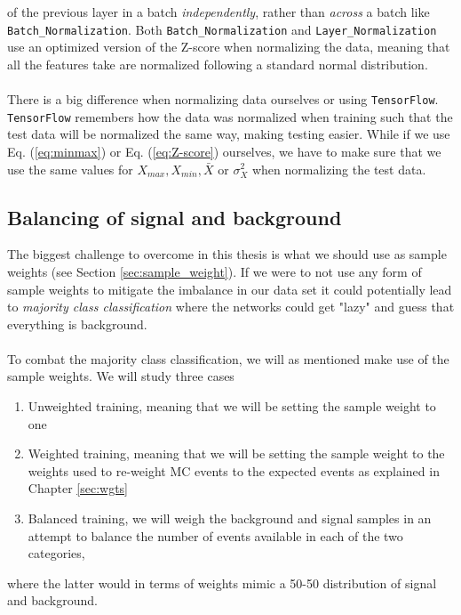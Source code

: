 \documentclass[12pt, a4paper]{book}
\begin{document}
of the previous layer in a batch \textit{independently}, rather than \textit{across} a batch like \verb|Batch_Normalization|. Both \verb|Batch_Normalization| and \verb|Layer_Normalization| use an optimized version of the Z-score when normalizing the data, meaning that all the features 
take are normalized following a standard normal distribution.\\
\\There is a big difference when normalizing data ourselves or using \verb|TensorFlow|. \verb|TensorFlow| remembers how the data was normalized when training such that the test data will be normalized the same way, making testing easier. While if we use Eq. (\ref{eq:minmax}) or 
Eq. (\ref{eq:Z-score}) ourselves, we have to make sure that we use the same values for $X_{max}, X_{min}, \bar{X}$ or $\sigma_X^2$ when normalizing the test data. 



\subsection{Balancing of signal and background}\label{sec:balance_NN}
The biggest challenge to overcome in this thesis is what we should use as sample weights (see Section \ref{sec:sample_weight}). If we were to not use any form of sample weights to mitigate the imbalance in our data set it could potentially lead to \textit{majority class classification} where the 
networks could get "lazy" and guess that everything is background. \\
\\To combat the majority class classification, we will as mentioned make use of the sample weights. We will study three cases
\begin{enumerate}
   \item Unweighted training, meaning that we will be setting the sample weight to one
   \item Weighted training, meaning that we will be setting the sample weight to the weights used to re-weight MC events to the expected events as explained in Chapter \ref{sec:wgts}
   \item Balanced training, we will weigh the background and signal samples in an attempt to balance the number of events available in each of the two categories,
\end{enumerate}
where the latter would in terms of weights mimic a 50-50 distribution of signal and background. 
\end{document}
